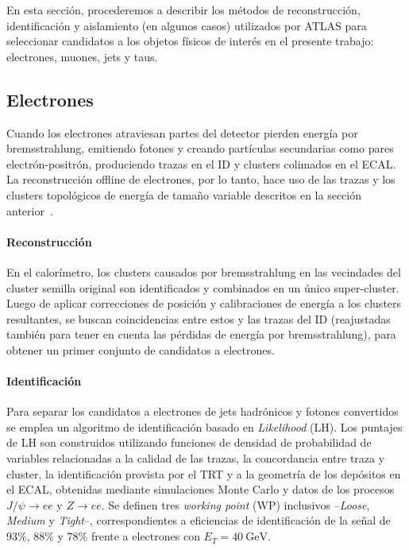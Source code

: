 En esta sección, procederemos a describir los métodos de reconstrucción, identificación y aislamiento (en algunos casos) utilizados por ATLAS para seleccionar candidatos a los objetos físicos de interés en el presente trabajo: electrones, muones, jets y taus.

\subsection{Electrones}

Cuando los electrones atraviesan partes del detector pierden energía por bremsstrahlung, emitiendo fotones y creando partículas secundarias como pares electrón-positrón, produciendo trazas en el ID y clusters colimados en el ECAL. La reconstrucción offline de electrones, por lo tanto, hace uso de las trazas y los clusters topológicos de energía de tamaño variable descritos en la sección anterior~\cite{TheATLASCollaboration2019}. 

\paragraph{Reconstrucción}

En el calorímetro, los clusters causados por bremsstrahlung en las vecindades del cluster semilla original son identificados y combinados en un único super-cluster. Luego de aplicar correcciones de posición y calibraciones de energía a los clusters resultantes, se buscan coincidencias entre estos y las trazas del ID (reajustadas también para tener en cuenta las pérdidas de energía por bremsstrahlung), para obtener un primer conjunto de candidatos a electrones.

\paragraph{Identificación}

Para separar los candidatos a electrones de jets hadrónicos y fotones convertidos se emplea un algoritmo de identificación basado en \textit{Likelihood} (LH). Los puntajes de LH son construidos utilizando funciones de densidad de probabilidad de variables relacionadas a la calidad de las trazas, la concordancia entre traza y cluster, la identificación provista por el TRT y a la geometría de los depósitos en el ECAL, obtenidas mediante simulaciones Monte Carlo y datos de los procesos $J/\psi \to ee$ y $Z \to ee$. Se definen tres \textit{working point} (WP) inclusivos --\textit{Loose}, \textit{Medium} y \textit{Tight}--, correspondientes a eficiencias de identificación de la señal de 93\%, 88\% y 78\% frente a electrones con $E_T = \SI{40}{\GeV}$.

